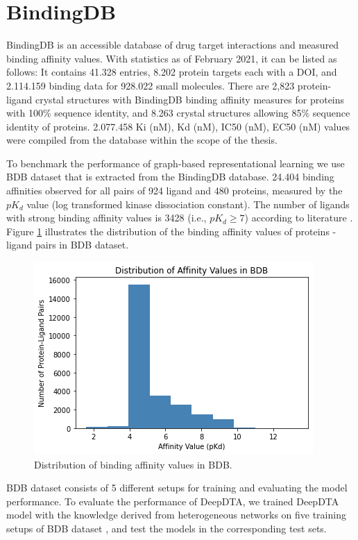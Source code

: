 \section{BindingDB}
BindingDB \cite{gilson2016bindingdb} is an accessible database of drug target interactions and measured binding affinity values. With statistics as of February 2021, it can be listed as follows: It contains 41.328 entries, 8.202 protein targets each with a DOI, and 2.114.159 binding data for 928.022 small molecules. There are 2,823 protein-ligand crystal structures with BindingDB binding affinity measures for proteins with 100\% sequence identity, and 8.263 crystal structures allowing 85\% sequence identity of proteins. 2.077.458 Ki (nM), Kd (nM), IC50 (nM), EC50 (nM) values were compiled from the database within the scope of the thesis. 

To benchmark the performance of graph-based representational learning we use BDB dataset \cite{ozccelik2021chemboost} that is extracted from the BindingDB database. 24.404 binding affinities observed for all pairs of 924 ligand and 480 proteins, measured by the $pK_d$ value (log transformed kinase dissociation constant). The number of ligands with strong binding affinity values is 3428 (i.e., $pK_d \geq 7$) according to literature \cite{he2017simboost}. Figure \ref{fig:bdb} illustrates the distribution of the binding affinity values of proteins - ligand pairs in BDB dataset. 

\begin{figure}
    \centering
        \includegraphics[width=0.5\linewidth]{chapters/datasetpreparation/figures/bdb.png} 
    \caption{Distribution of binding affinity values in BDB.}
    \label{fig:bdb}
\end{figure}

BDB dataset consists of 5 different setups for training and evaluating the model performance. To evaluate the performance of DeepDTA, we trained DeepDTA model with the knowledge derived from heterogeneous networks on five training setups of BDB dataset \cite{ozccelik2021chemboost}, and test the models in the corresponding test sets. 